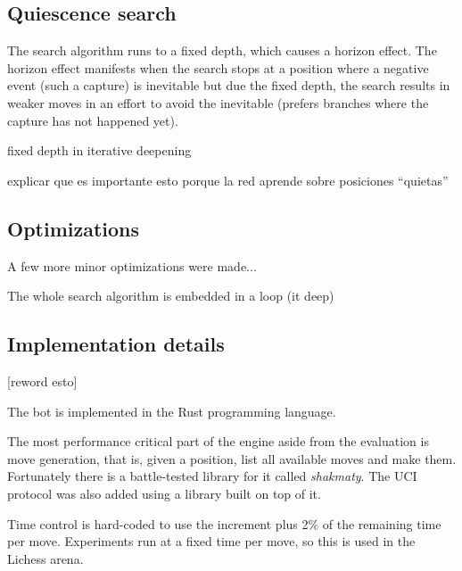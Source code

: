 \subsection{Quiescence search}

The search algorithm runs to a fixed depth, which causes a horizon effect. The horizon effect manifests when the search stops at a position where a negative event (such a capture) is inevitable but due the fixed depth, the search results in weaker moves in an effort to avoid the inevitable (prefers branches where the capture has not happened yet).



fixed depth in iterative deepening

explicar que es importante esto porque la red aprende sobre posiciones \enquote{quietas}

\subsection{Optimizations}

A few more minor optimizations were made...

The whole search algorithm is embedded in a loop (it deep)




\subsection{Implementation details}

[reword esto]

The bot is implemented in the Rust programming language.

The most performance critical part of the engine aside from the evaluation is move generation, that is, given a position, list all available moves and make them.
Fortunately there is a battle-tested library for it called \textit{shakmaty}. The UCI protocol was also added using a library built on top of it.

Time control is hard-coded to use the increment plus 2\% of the remaining time per move. Experiments run at a fixed time per move, so this is used in the Lichess arena.


